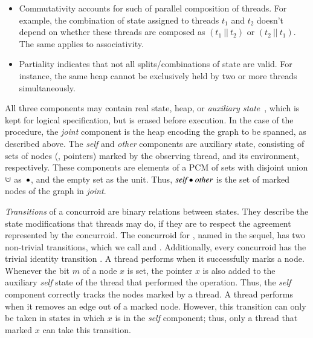 \begin{itemize}[itemindent=0pt]

\item Commutativity accounts for such of parallel composition
  of threads. For example, the combination of state assigned to threads
  $t_1$ and $t_2$ doesn't depend on whether these threads are composed as
  $(t_1~||~t_2)$ or $(t_2~||~t_1)$. The same applies to associativity.

\item Partiality indicates that not all splits/combinations of state
  are valid. For instance, the same heap cannot be exclusively held by
  two or more threads simultaneously.

\end{itemize}

\noindent
All three components may contain real state, \ie heap, or
\emph{auxiliary state}~\cite{Lucas:TR,Owicki-Gries:CACM76}, which is
kept for logical specification, but is erased before execution.
%
In the case of the  procedure, the \emph{joint} component
is the heap encoding the graph to be spanned, as described above.
%
%
The \emph{self} and \emph{other} components are auxiliary state,
consisting of sets of nodes (\ie, pointers) marked by the observing
thread, and its environment, respectively. These components are
elements of a PCM of sets with disjoint union $\dotcup$ as~$\bullet$,
and the empty set as the unit. Thus, $\emph{self} \bullet \emph{other}$
is the set of marked nodes of the graph in \emph{joint}.

%
 
\emph{Transitions} of a concurroid are binary relations between
states. They describe the state modifications that threads may do, if
they are to respect the agreement represented by the concurroid.
The concurroid for , named  in the sequel, 
has two non-trivial transitions, which
we call  and . Additionally,
every concurroid has the trivial identity transition .
%
A thread performs  when it successfully marks a
node. Whenever the bit $m$ of a node $x$ is set, the pointer $x$ is
also added to the auxiliary \emph{self} state of the thread that
performed the operation. Thus, the \emph{self} component correctly
tracks the nodes marked by a thread.
%
A thread performs  when it removes an edge out of
a marked node. However, this transition can only be taken in 
states in which $x$ is in the \emph{self} component; thus, only a
thread that marked $x$ can take this transition.

